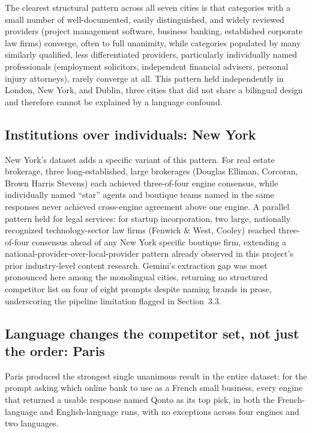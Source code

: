 \documentclass[11pt]{article}
\begin{document}
The clearest structural pattern across all seven cities is that categories with a small
number of well-documented, easily distinguished, and widely reviewed providers (project
management software, business banking, established corporate law firms) converge, often
to full unanimity, while categories populated by many similarly qualified, less
differentiated providers, particularly individually named professionals (employment
solicitors, independent financial advisers, personal injury attorneys), rarely converge
at all. This pattern held independently in London, New York, and Dublin, three cities
that did not share a bilingual design and therefore cannot be explained by a language
confound.

\subsection{Institutions over individuals: New York}

New York's dataset adds a specific variant of this pattern. For real estate brokerage,
three long-established, large brokerages (Douglas Elliman, Corcoran, Brown Harris
Stevens) each achieved three-of-four engine consensus, while individually named
``star'' agents and boutique teams named in the same responses never achieved
cross-engine agreement above one engine. A parallel pattern held for legal services:
for startup incorporation, two large, nationally recognized technology-sector law firms
(Fenwick \& West, Cooley) reached three-of-four consensus ahead of any New York
specific boutique firm, extending a national-provider-over-local-provider pattern
already observed in this project's prior industry-level content research. Gemini's
extraction gap was most pronounced here among the monolingual cities, returning no
structured competitor list on four of eight prompts despite naming brands in prose,
underscoring the pipeline limitation flagged in Section~3.3.

\subsection{Language changes the competitor set, not just the order: Paris}

Paris produced the strongest single unanimous result in the entire dataset: for the
prompt asking which online bank to use as a French small business, every engine that
returned a usable response named Qonto as its top pick, in both the French-language and
English-language runs, with no exceptions across four engines and two languages.
\end{document}
